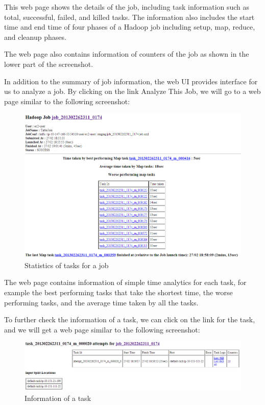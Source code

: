 This web page shows the details of the job, including task information such as total, successful, failed, and killed tasks. The information also includes the start time and end time of four phases of a Hadoop job including setup, map, reduce, and cleanup phases.

The web page also contains information of counters of the job as shown in the lower part of the screenshot.

In addition to the summary of job information, the web UI provides interface for us to analyze a job. By clicking on the link Analyze This Job, we will go to a web page similar to the following screenshot:
\begin{figure}[h]
  \centering
  \includegraphics[width=\textwidth]{figs/5163OS_04_03.png}
  \caption{Statistics of tasks for a job}\label{fig:task.statistics}
\end{figure} 

The web page contains information of simple time analytics for each task, for example the best performing tasks that take the shortest time, the worse performing tasks, and the average time taken by all the tasks.

To further check the information of a task, we can click on the link for the task, and we will get a web page similar to the following screenshot:
\begin{figure}[h]
  \centering
  \includegraphics[width=.7\textwidth]{figs/5163OS_04_04.png}
  \caption{Information of a task}\label{fig:task.info}
\end{figure} 

